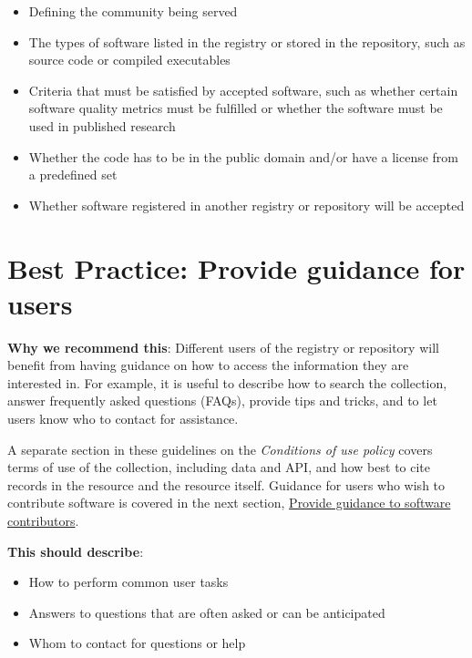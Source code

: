 \documentclass[11pt]{article}
\begin{document}
\begin{itemize}
\item Defining the community being served

\item The types of software listed in the registry or stored in the repository, such as source code or compiled executables

\item Criteria that must be satisfied by accepted software, such as whether certain software quality metrics must be fulfilled or whether the software must be used in published research

\item Whether the code has to be in the public domain and/or have a license from a predefined set

\item Whether software registered in another registry or repository will be accepted

\end{itemize}


\section{Best Practice: Provide guidance for users}
\label{best-practice-provide-guidance-for-users}

\textbf{Why we recommend this}: Different users of the registry or repository will benefit from having guidance on how to access the information they are interested in. For example, it is useful to describe how to search the collection, answer frequently asked questions (FAQs), provide tips and tricks, and to let users know who to contact for assistance.

A separate section in these guidelines on the \emph{Conditions of use policy} covers terms of use of the collection, including data and API, and how best to cite records in the resource and the resource itself. Guidance for users who wish to contribute software is covered in the next section, \hyperref[best-practice-provide-guidance-to-software-contributors]{Provide guidance to software contributors}.

\textbf{This should describe}:

\begin{itemize}
\item How to perform common user tasks

\item Answers to questions that are often asked or can be anticipated

\item Whom to contact for questions or help

\end{itemize}
\end{document}
